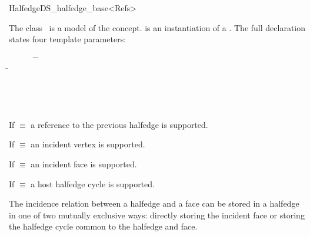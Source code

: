 
\ccRefPageBegin



\begin{ccRefClass}{HalfedgeDS_halfedge_base<Refs>}

\ccDefinition
  
The class \ccRefName\ is a model of the 
concept.  is an instantiation of a . 
The full declaration states four template parameters:

\begin{tabbing}
\mbox{}~~~~~~ \=  \=\\
              \> \> \=\\
              \> \> \> \\
              \> \> \> \\
              \> \> \> \\
     \> 
\end{tabbing}

If  $\equiv$  a reference to the previous
halfedge is supported.

If  $\equiv$  an incident vertex is
supported.

If  $\equiv$  an incident face is
supported.

{\XHDS If  $\equiv$  a host halfedge cycle  is
supported.}

{\XHDS
The incidence relation between a halfedge and a face can be stored in a halfedge in 
one of two mutually exclusive ways: directly storing the incident face or
storing the halfedge cycle common to the halfedge and face.
}


\end{ccRefClass}
